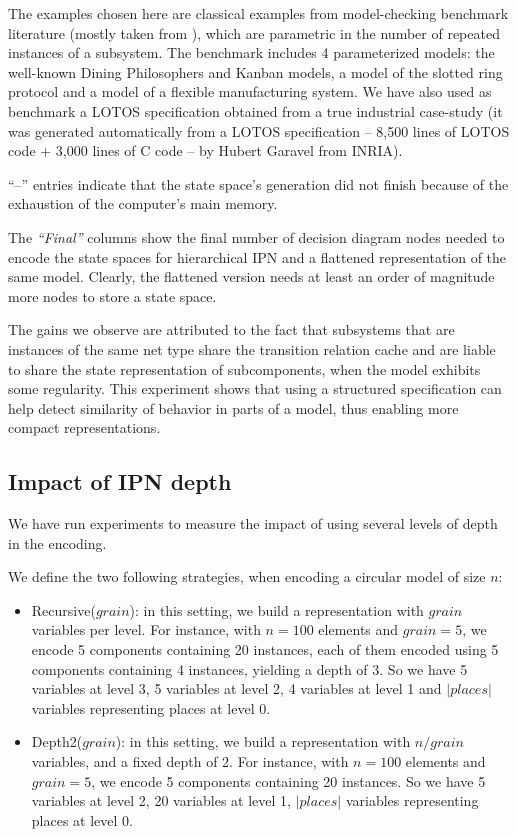 The examples chosen here are classical examples from
model-checking benchmark literature (mostly taken from \cite{ciardo03saturation}),
 which are parametric in the number of repeated instances of a subsystem.
 The benchmark includes 4 parameterized models: the
well-known Dining Philosophers and Kanban models, a model of the slotted ring
protocol and a model of a flexible manufacturing system. We have also used as benchmark
a LOTOS specification obtained from a true industrial case-study (it was
generated automatically from a LOTOS specification -- 8,500 lines of LOTOS
code + 3,000 lines of C code -- by Hubert Garavel from INRIA).

``--'' entries indicate that the state space's generation did not
finish because of the exhaustion of the computer's main memory.

The \emph{``Final''} columns show the final number of decision diagram
nodes needed to encode the state spaces for hierarchical IPN and a
flattened representation of the same model.  Clearly, the flattened
version needs at least an order of magnitude more nodes to store a
state space. 

The gains we observe are attributed to the fact that subsystems that
are instances of the same net type share the transition relation cache
and are liable to share the state representation of subcomponents,
when the model exhibits some regularity. This experiment shows that
using a structured specification can help detect similarity of
behavior in parts of a model, thus enabling more compact representations.

\subsection{Impact of IPN depth}
\label{sub:perfs}

We have run experiments to measure the impact of using several levels of depth in the encoding.

We define the two following strategies, when encoding a circular model of size $n$:
\begin{itemize}
\item Recursive($\mathit{grain}$): in this setting, we build a representation with $\mathit{grain}$ variables per level. For instance, with 
$n=100$ elements and $\mathit{grain}=5$, we encode 5 components containing 20 instances, each of them encoded using 5 components containing 4 instances, yielding a depth of 3. So we have 5 variables at level 3, 5 variables at level 2, 4 variables at level 1 and $|places|$ variables representing places at level $0$.
\item Depth2($\mathit{grain}$): in this setting, we build a representation with $n / \mathit{grain}$ variables, and a fixed depth of 2. For instance, with 
$n=100$ elements and $\mathit{grain}=5$, we encode 5 components containing 20 instances. So we have 5 variables at level 2, 20 variables at level 1, $|places|$ variables representing places at level $0$. 
\end{itemize}

